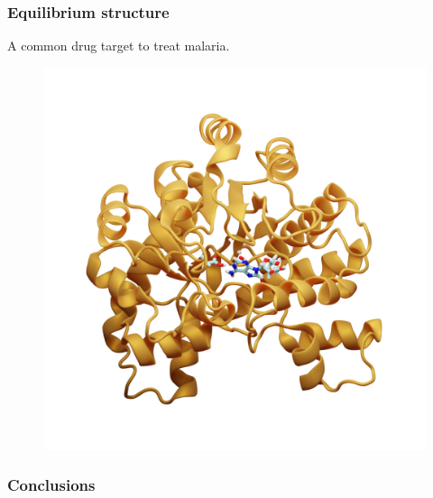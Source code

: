 \documentclass{beamer}
\begin{document}
\begin{frame}
\frametitle{Equilibrium structure}
A common drug target to treat malaria.
\begin{figure}
\includegraphics[scale=0.6]{figures/ada-equil.png}
\end{figure}
\end{frame}
\begin{frame}
\frametitle{Conclusions}

\end{frame}
\end{document}
